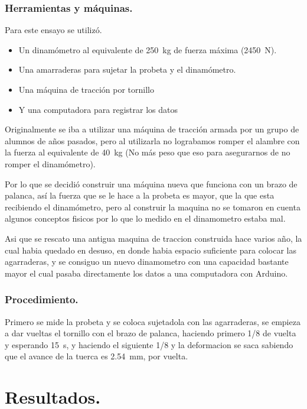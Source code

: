 \documentclass[12pt,a4paper]{article}
\begin{document}
\subsubsection{Herramientas y máquinas.}

Para este ensayo se utilizó.
\begin{itemize}
    \item Un dinamómetro al equivalente de \SI{250}{\kilogram} de fuerza máxima (\SI{2450}{\newton}).
    \item Una amarraderas para sujetar la probeta y el dinamómetro.
    \item Una máquina de tracción por tornillo
    \item Y una computadora para registrar los datos
\end{itemize}
 
Originalmente se iba a utilizar una máquina de tracción armada por un grupo de alumnos de años pasados, pero al utilizarla no lograbamos romper el alambre con la fuerza al equivalente de \SI{40}{\kilogram} (No más peso que eso para asegurarnos de no romper el dinamómetro).

Por lo que se decidió construir una máquina nueva que funciona con un brazo de palanca, así la fuerza que se le hace a la probeta es mayor, que la que esta recibiendo el dinamómetro, pero al construir la maquina no se tomaron en cuenta algunos conceptos fisicos por lo que lo medido en el dinamometro estaba mal. 

Asi que se rescato una antigua maquina de traccion construida hace varios año, la cual habia quedado en desuso, en donde habia espacio suficiente para colocar las agarraderas, y se consiguo un nuevo dinamometro con una capacidad bastante mayor el cual pasaba directamente los datos a una computadora con Arduino.

\subsubsection{Procedimiento.}

Primero se mide la probeta y se coloca sujetadola con las agarraderas, se empieza a dar vueltas el tornillo con el brazo de palanca, haciendo primero 1/8 de vuelta y esperando \SI{15}{\second}, y haciendo el siguiente 1/8 y la deformacion se saca sabiendo que el avance de la tuerca es \SI{2.54}{\milli\meter}, por vuelta.

\section{Resultados.}
\end{document}
